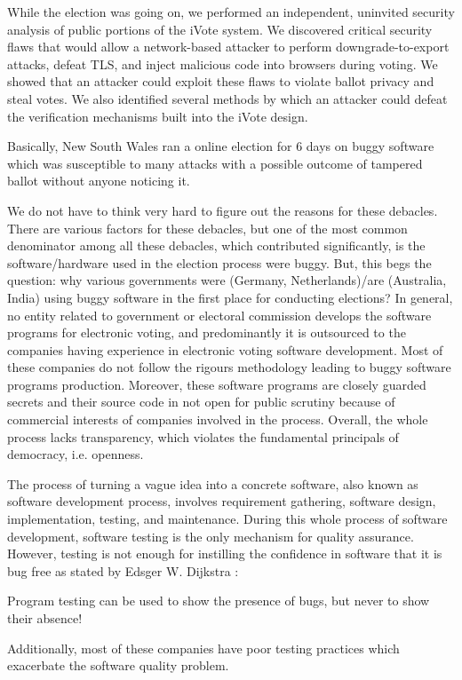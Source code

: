   \begin{displayquote}
  
  
   While the election was going on, we performed an independent,
   uninvited security analysis of public portions of the iVote 
   system. We discovered critical security flaws that would allow
   a network-based attacker to perform downgrade-to-export 
   attacks, defeat TLS, and inject malicious code 
   into browsers during voting. We showed that an attacker could
   exploit these flaws to violate ballot privacy and steal votes. 
   We also identified several methods by which an attacker could
   defeat the verification mechanisms built into the iVote design.
   
   \end{displayquote}
  
  \noindent
  Basically, New South Wales ran a online election for 6 days on 
  buggy software which was susceptible to many attacks with a possible 
  outcome of tampered ballot without anyone noticing it. 

   We do not have to think very hard to figure out the reasons for 
   these debacles. 
   There are various factors for these debacles, but one of the most 
   common denominator among all these debacles,
   which contributed significantly,  is the software/hardware used in the election process 
   were buggy. But, this begs the question: why various governments 
   were (Germany, Netherlands)/are (Australia, India) using buggy software in the first place for 
   conducting elections? 
   In general, no entity related to government or electoral commission develops the software programs 
   for electronic voting, and predominantly it is outsourced 
   to the companies having experience in electronic voting software development.    
   Most of these companies do not follow the rigours methodology leading 
   to buggy software programs production.
   Moreover, these software programs
   are closely guarded secrets and their source 
   code in not open for public scrutiny because of commercial 
   interests of companies \citep{AEC:2013:LMM} involved in the 
   process.  Overall, the whole process lacks transparency, which 
   violates the fundamental principals of democracy, i.e. openness. 
  
   The process  of turning a vague idea into a 
   concrete software, also known as software development process, involves 
   requirement gathering, software design, implementation, testing, and maintenance. 
   During this whole process of software development, software testing is the only 
   mechanism for quality assurance. However, testing is not enough for 
   instilling the confidence in software that it is bug free 
   as stated by Edsger W. Dijkstra \citep{Dijkstra:1972:HP:355604.361591}:
   \begin{displayquote}
   Program testing can be used to show the presence of bugs, 
    but never to show their absence!
   \end{displayquote}
   Additionally, most of these companies have poor testing practices which 
   exacerbate the software quality problem.
   
